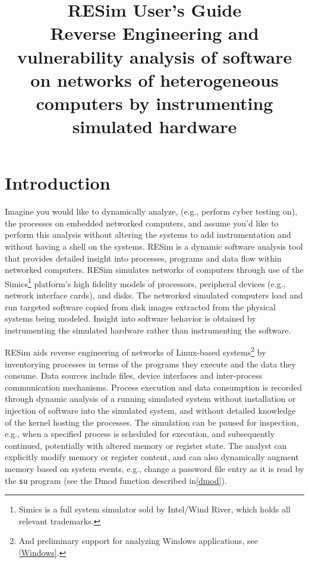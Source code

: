 \documentclass[titlepage]{article}
\begin{document}
\title {%
  RESim User's Guide \\
  \large Reverse Engineering and vulnerability analysis of software on networks of heterogeneous computers
   by instrumenting simulated hardware}
\maketitle
\tableofcontents
\newpage

\section{Introduction}
Imagine you would like to dynamically analyze, (e.g., perform cyber testing on), the processes on embedded networked computers, and assume 
you'd like to perform this analysis without altering the systems to add instrumentation and without having a shell on the systems.
RESim is a dynamic software analysis tool that provides detailed insight into processes, programs and data flow within networked computers.  RESim simulates networks of computers through use of the Simics\footnote{ Simics is a full system simulator sold by Intel/Wind River, which holds all relevant trademarks.} 
platform's high fidelity models of processors, peripheral devices (e.g., network interface cards), and disks.  The networked simulated computers load and run targeted software copied from disk images extracted from the physical systems being modeled.  Insight into software behavior is obtained by instrumenting the simulated hardware
rather than instrumenting the software.

RESim aids reverse engineering of networks of Linux-based systems\footnote{And preliminary support for analyzing Windows applications, see \ref{Windows}.} by inventorying processes in terms of the programs they execute and the data they consume.  Data sources include files, device interfaces and inter-process communication mechanisms.   Process execution and data consumption is recorded through dynamic analysis of a running simulated system without installation or injection of software into the simulated system, and without detailed knowledge of the kernel hosting the processes.
The simulation can be paused for inspection, e.g., when a specified process is scheduled for execution, and subsequently continued, potentially with altered memory or register state.  The analyst can explicitly modify memory or register content, and can also dynamically augment memory 
based on system events, e.g., change a password file entry as it is read by the {\tt su} program (see the Dmod function described in\ref{dmod}).
\end{document}
